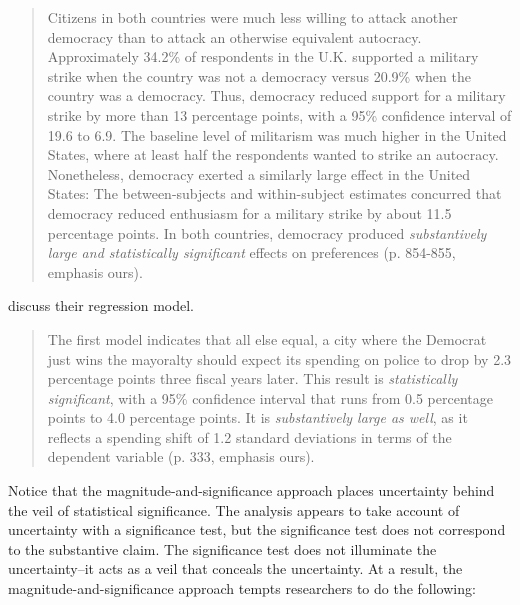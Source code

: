 \documentclass[12pt]{article}
\begin{document}
\begin{quote}
Citizens in both countries were much less willing to attack another democracy than to attack an otherwise equivalent autocracy. Approximately 34.2\% of respondents in the U.K. supported a military strike when the country was not a democracy versus 20.9\% when the country was a democracy. Thus, democracy reduced support for a military strike by more than 13 percentage points, with a 95\% confidence interval of 19.6 to 6.9. The baseline level of militarism was much higher in the United States, where at least half the respondents wanted to strike an autocracy. Nonetheless, democracy exerted a similarly large effect in the United States: The between-subjects and within-subject estimates concurred that democracy reduced enthusiasm for a military strike by about 11.5 percentage points. In both countries, democracy produced \emph{substantively large and statistically significant} effects on preferences (p. 854-855, emphasis ours).
\end{quote}

\cite{GerberHopkins2011} discuss their regression model.

\begin{quote}
The first model indicates that all else equal, a city where the Democrat just wins the mayoralty should expect its spending on police to drop by 2.3 percentage points three fiscal years later. This result is \emph{statistically significant}, with a 95\% confidence interval that runs from 0.5 percentage points to 4.0 percentage points. It is \emph{substantively large as well}, as it reflects a spending shift of 1.2 standard deviations in terms of the dependent variable (p. 333, emphasis ours).
\end{quote}

%

Notice that the magnitude-and-significance approach places uncertainty behind the veil of statistical significance. The analysis appears to take account of uncertainty with a significance test, but the significance test does not correspond to the substantive claim. The significance test does not illuminate the uncertainty--it acts as a veil that conceals the uncertainty. At a result, the magnitude-and-significance approach tempts researchers to do the following:
\end{document}
